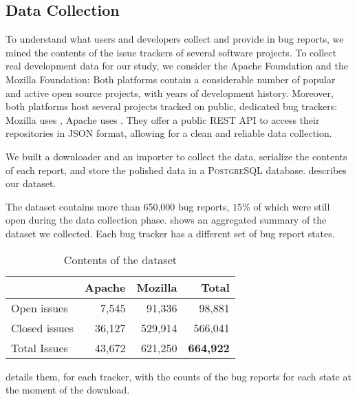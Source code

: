 \subsection{Data Collection} \label{sec:model-collection}

To understand what users and developers collect and provide in bug reports, we mined the contents of the issue trackers of several software projects.
To collect real development data for our study, we consider the Apache Foundation and the Mozilla Foundation: Both platforms contain a considerable number of popular and active open source projects, with years of development history.
Moreover, both platforms host several projects tracked on public, dedicated bug trackers: Mozilla uses \bzilla, Apache uses \jira.
They offer a public \textsc{REST} API to access their repositories in \textsc{JSON} format, allowing for a clean and reliable data collection.

We built a downloader and an importer to collect the data, serialize the contents of each report, and store the polished data in a \textsc{PostgreSQL} database.
 describes our dataset.

The dataset contains more than 650,000 bug reports, $15\%$ of which were still open during the data collection phase.
 shows an aggregated summary of the dataset we collected.
Each bug tracker has a different set of bug report states.

\begin{table}[h]
\begin{center}
\caption{Contents of the dataset}
\begin{tabular}{l|r|r|r}
 & Apache & Mozilla & Total \\
\hline
Open issues & 7,545 & 91,336 & 98,881 \\
Closed issues & 36,127 & 529,914 & 566,041 \\
Total Issues & 43,672 & 621,250 & {\bf 664,922} \\ \hline
\end{tabular}
\label{tab:dataset}
\end{center}
\end{table}

 details them, for each tracker, with the counts of the bug reports for each state at the moment of the download.

